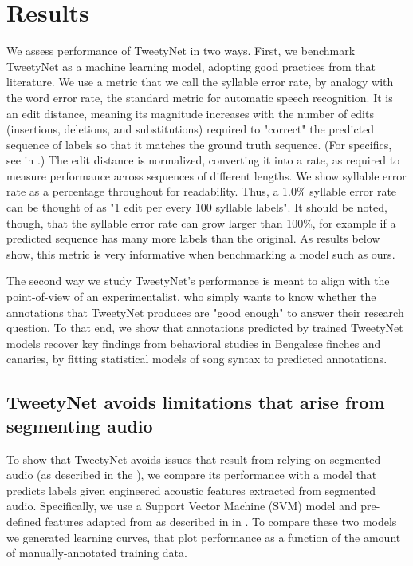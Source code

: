 \documentclass[9pt,lineno]{elife}
\begin{document}
\FloatBarrier

\section{Results}
\label{Results}

We assess performance of TweetyNet in two ways.
First, we benchmark TweetyNet as a machine learning model, 
adopting good practices from that literature. 
We use a metric that we call the 
syllable error rate, by analogy with the word error rate, 
the standard metric for automatic speech recognition.
It is an edit distance, meaning its magnitude increases with the number of edits 
(insertions, deletions, and substitutions) 
required to "correct" the predicted sequence of labels so that 
it matches the ground truth sequence. 
(For specifics, see  in .)
The edit distance is normalized, 
converting it into a rate, 
as required to measure performance across sequences of different lengths.
We show syllable error rate as a percentage throughout for readability. 
Thus, a 1.0\% syllable error rate can be thought of as "1 edit per every 100 syllable labels".
It should be noted, though, that the syllable error rate can grow larger than 100\%,  
for example if a predicted sequence has many more labels than the original.
As results below show, 
this metric is very informative when benchmarking a model such as ours. 

The second way we study TweetyNet's performance is meant to align 
with the point-of-view of an experimentalist, who simply wants to know 
whether the annotations that TweetyNet produces 
are "good enough" to answer their research question.
To that end, we show that annotations predicted by trained TweetyNet models 
recover key findings from behavioral studies 
in Bengalese finches and canaries,
by fitting statistical models of song syntax to predicted annotations.

\subsection{TweetyNet avoids limitations that arise from segmenting audio}
\label{results:tweetynet-vs-svm}
To show that TweetyNet avoids issues that result from relying on segmented audio 
(as described in the ), 
we compare its performance with a model 
that predicts labels given engineered acoustic features extracted from segmented audio. 
Specifically, we use a Support Vector Machine (SVM) model 
and pre-defined features adapted from \cite{tachibana2014semi} 
as described in  in .
To compare these two models we generated learning curves, 
that plot performance as a function of the amount of manually-annotated training data.
\end{document}

